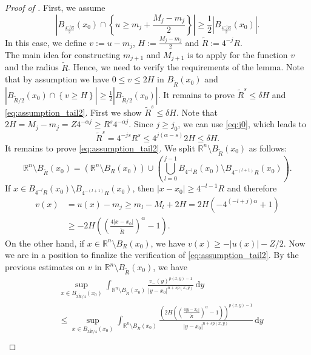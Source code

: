 \documentclass[11pt]{amsart}
\theoremstyle{plain}
\theoremstyle{definition}
\numberwithin{equation}{section}
\newcommand{\R}{\mathbb{R}}
\begin{document}
\begin{proof} [Proof of ]
First, we assume 
\begin{equation}\label{eq:Hoeldcase1}
 \left| B_{\frac{4^{-j}R}{2}}(x_0) \cap \left\{ u\geq m_{j} + \frac{M_j-m_j}{2} \right\} \right| \geq \frac{1}{2}\left| B_{\frac{4^{-j}R}{2}}(x_0) \right|. 
\end{equation}
In this case, we define $v:=u-m_j$, $H:=\frac{M_j-m_j}{2}$ and $\widetilde{R}:=4^{-j}R$. \\
The main idea for constructing $m_{j+1}$ and $M_{j+1}$ is to apply  for the function $v$ and the radius $\widetilde{R}$. Hence, we need to verify the requirements of the lemma.
Note that by assumption we have $0\leq v\leq 2H$ in $B_{\widetilde{R}}(x_0)$ and  $| B_{\widetilde{R}/2}(x_0) \cap \left\{ v\geq H \right\} | \geq \frac{1}{2}| B_{\widetilde{R}/2}(x_0)|.$ It remains to prove $\widetilde{R}^s\leq \delta H$ and \eqref{eq:assumption_tail2}. First we show $\widetilde{R}^s\leq \delta H$. Note that $2H = M_j - m_j = Z4^{-\alpha j} \geq R^s 4^{-\alpha j}$. Since $j\geq j_0$, we can use \eqref{eq:j0}, which leads to
\[ \widetilde{R}^s = 4^{-js} R^s \leq  4^{j(\alpha-s)}2H \leq \delta H.\]
It remains to prove \eqref{eq:assumption_tail2}. We split $\R^n\setminus B_{\widetilde{R}}(x_0)$ as follows:
\[ \R^n\setminus B_{\widetilde{R}}(x_0) = \left(\R^n\setminus B_R(x_0)\right) \cup \left(\bigcup_{l=0}^{j-1} B_{4^{-l}R}(x_0) \setminus B_{4^{-(l+1)}R}(x_0)\right). \]
If $x\in B_{4^{-l}R}(x_0) \setminus B_{4^{-(l+1)}R}(x_0)$, then $|x-x_0|\geq 4^{-l-1}R$ and therefore
\begin{align*}
v(x) &= u(x)-m_j \geq m_l-M_l + 2H  = 2H(-4^{(-l+j)\alpha}+1) \\
& \geq -2H\left(\left( \frac{4|x-x_0|}{\widetilde{R}} \right)^{\alpha}-1\right). 
\end{align*}
On the other hand, if $x\in \R^n\setminus B_R(x_0)$, we have $v(x) \geq -|u(x)|-Z/2$.
 Now we are in a position to finalize the verification of \eqref{eq:assumption_tail2}. By the previous estimates on $v$ in $\R^n\setminus B_{\widetilde{R}}(x_0)$, we have
\begin{align*}
&\sup_{x \in B_{3\widetilde{R}/4}(x_0)} \int_{\mathbb{R}^n \setminus B_{\widetilde{R}}(x_0)} \frac{v_-(y)^{p(x,y)-1}}{|y-x_0|^{n+sp(x,y)}} \,\mathrm{d}y \\
&\leq \sup_{x \in B_{3\widetilde{R}/4}(x_0)} \int_{\R^n \setminus B_{\widetilde{R}}(x_0)} \frac{\left(2H\left(\left( \frac{4|y-x_0|}{\widetilde{R}} \right)^{\alpha}-1\right)\right)^{p(x,y)-1} }{|y-x_0|^{n+sp(x,y)}} \,\mathrm{d}y  \\

\end{align*}
\end{proof}
\end{document}
